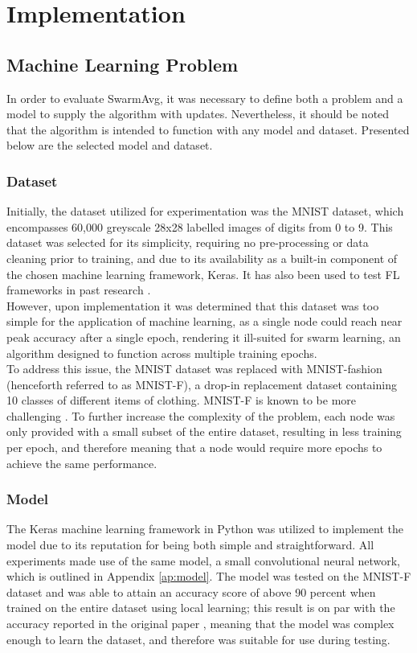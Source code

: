 \chapter{Implementation}
\section{Machine Learning Problem}
In order to evaluate SwarmAvg, it was necessary to define both a problem and a model to supply the algorithm with updates. Nevertheless, it should be noted that the algorithm is intended to function with any model and dataset. Presented below are the selected model and dataset.

\subsection{Dataset}
Initially, the dataset utilized for experimentation was the MNIST dataset, which encompasses 60,000 greyscale 28x28 labelled images of digits from 0 to 9. This dataset was selected for its simplicity, requiring no pre-processing or data cleaning prior to training, and due to its availability as a built-in component of the chosen machine learning framework, Keras. It has also been used to test FL frameworks in past research \cite{leaderelec_car}. \\

However, upon implementation it was determined that this dataset was too simple for the application of machine learning, as a single node could reach near peak accuracy after a single epoch, rendering it ill-suited for swarm learning, an algorithm designed to function across multiple training epochs. \\

To address this issue, the MNIST dataset was replaced with MNIST-fashion (henceforth referred to as MNIST-F), a drop-in replacement dataset containing 10 classes of different items of clothing. MNIST-F is known to be more challenging \cite{xiao2017fashionmnist}. To further increase the complexity of the problem, each node was only provided with a small subset of the entire dataset, resulting in less training per epoch, and therefore meaning that a node would require more epochs to achieve the same performance.

\subsection{Model}
The Keras machine learning framework in Python was utilized to implement the model due to its reputation for being both simple and straightforward. All experiments made use of the same model, a small convolutional neural network, which is outlined in Appendix \ref{ap:model}. The model was tested on the MNIST-F dataset and was able to attain an accuracy score of above 90 percent when trained on the entire dataset using local learning; this result is on par with the accuracy reported in the original paper \cite{xiao2017fashionmnist}, meaning that the model was complex enough to learn the dataset, and therefore was suitable for use during testing.



